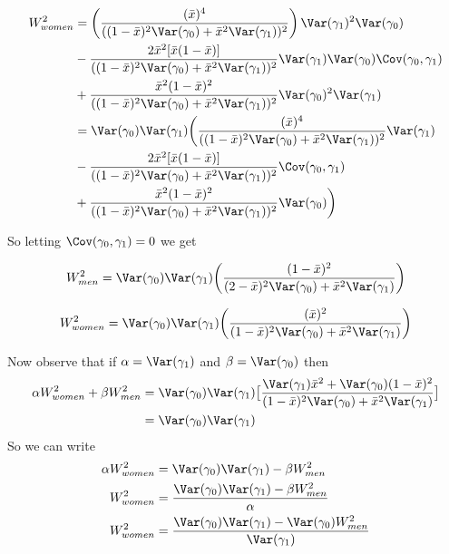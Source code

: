 \begin{align*}
	W_{women}^2 &= \left(\frac{(\bar{x})^4}{((1-\bar{x})^2 \Var(\gamma_0) + \bar{x}^2 \Var(\gamma_1))^2}\right)\Var(\gamma_1)^2 \Var(\gamma_0)  \\
				& -  \frac{2 \bar{x}^2[\bar{x} (1-\bar{x})]}{((1-\bar{x})^2 \Var(\gamma_0) + \bar{x}^2 \Var(\gamma_1))^2} \Var(\gamma_1) \Var(\gamma_0) \Cov(\gamma_0, \gamma_1)  \\
				& + \frac{\bar{x}^2 (1-\bar{x})^2}{((1-\bar{x})^2 \Var(\gamma_0) + \bar{x}^2 \Var(\gamma_1))^2} \Var(\gamma_0)^2 \Var(\gamma_1) \\
				&= \Var(\gamma_0) \Var(\gamma_1) \bigg(\frac{(\bar{x})^4}{((1-\bar{x})^2 \Var(\gamma_0) + \bar{x}^2 \Var(\gamma_1))^2}\Var(\gamma_1) \\
				& -  \frac{2 \bar{x}^2[\bar{x} (1-\bar{x})]}{((1-\bar{x})^2 \Var(\gamma_0) + \bar{x}^2 \Var(\gamma_1))^2} \Cov(\gamma_0, \gamma_1)  \\
				& + \frac{\bar{x}^2 (1-\bar{x})^2}{((1-\bar{x})^2 \Var(\gamma_0) + \bar{x}^2 \Var(\gamma_1))^2} \Var(\gamma_0) \bigg) \\
\end{align*} 


So letting $\Cov(\gamma_0, \gamma_1) = 0$ we get

\begin{align*}
	W_{men}^2 &= \Var(\gamma_0) \Var(\gamma_1) \bigg(\frac{(1 - \bar{x})^2 }{(2-\bar{x})^2 \Var(\gamma_0) + \bar{x}^2 \Var(\gamma_1)} \bigg) \\
\end{align*} 

\begin{align*}
	W_{women}^2 &= \Var(\gamma_0) \Var(\gamma_1) \bigg(\frac{(\bar{x})^2 }{(1-\bar{x})^2 \Var(\gamma_0) + \bar{x}^2 \Var(\gamma_1)} \bigg) \\
\end{align*} 



Now observe that if $\alpha = \Var(\gamma_1)$ and $\beta = \Var(\gamma_0)$ then
\begin{align*}
	\alpha W_{women}^2 + \beta W_{men}^2 &= \Var(\gamma_0) \Var(\gamma_1) \big[ \frac{\Var(\gamma_1) \bar{x}^2 + \Var(\gamma_0) (1- \bar{x})^2}{(1-\bar{x})^2 \Var(\gamma_0) + \bar{x}^2 \Var(\gamma_1)} \big] \\
										 &= \Var(\gamma_0) \Var(\gamma_1)
\end{align*} 
So we can write
\begin{align*}
	\alpha W^{2}_{women} &= \Var(\gamma_0) \Var(\gamma_1) - \beta W^{2}_{men} \\
	W^{2}_{women} &= \frac{\Var(\gamma_0) \Var(\gamma_1) - \beta W^{2}_{men}}{\alpha} \\
	W^{2}_{women} &= \frac{\Var(\gamma_0) \Var(\gamma_1) - \Var(\gamma_0) W^{2}_{men}}{\Var(\gamma_1)} \\
\end{align*} 


